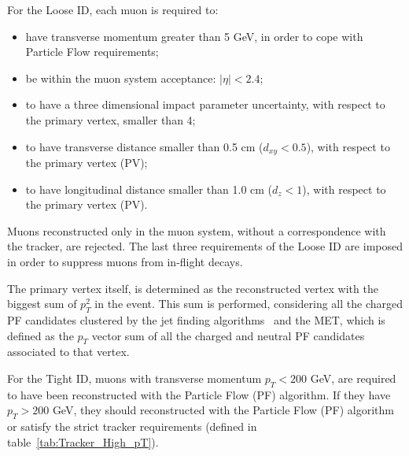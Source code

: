 For the Loose ID, each muon is required to:
\begin{itemize}
  \item have transverse momentum greater than 5 GeV, in order to cope with Particle Flow requirements;
  \item be within the muon system acceptance: $|\eta| < 2.4$;
  \item to have a three dimensional impact parameter uncertainty, with respect to the primary vertex, smaller than 4;
  \item to have transverse distance smaller than 0.5 cm ($d_{xy} < 0.5$), with respect to the primary vertex (PV);
  \item to have longitudinal distance smaller than 1.0 cm ($d_{z} < 1$), with respect to the primary vertex (PV).

\end{itemize}

Muons reconstructed only in the muon system, without a correspondence with the tracker, are rejected. The last three requirements of the Loose ID are imposed in order to suppress muons from in-flight decays.

The primary vertex itself, is determined as the reconstructed vertex with the biggest sum of $p_T^2$ in the event. This sum is performed, considering all the charged PF candidates clustered by the jet finding algorithms~\cite{Cacciari:2008gp,Cacciari:2011ma} and the MET, which is defined as the $p_T$ vector sum of all the charged and neutral PF candidates associated to that vertex. 

For the Tight ID, muons with transverse momentum $p_{T} < 200$ GeV, are required to have been reconstructed with the Particle Flow (PF) algorithm. If they have $p_{T} > 200$ GeV, they should reconstructed with the Particle Flow (PF) algorithm or satisfy the strict tracker requirements (defined in table~\ref{tab:Tracker_High_pT}).

